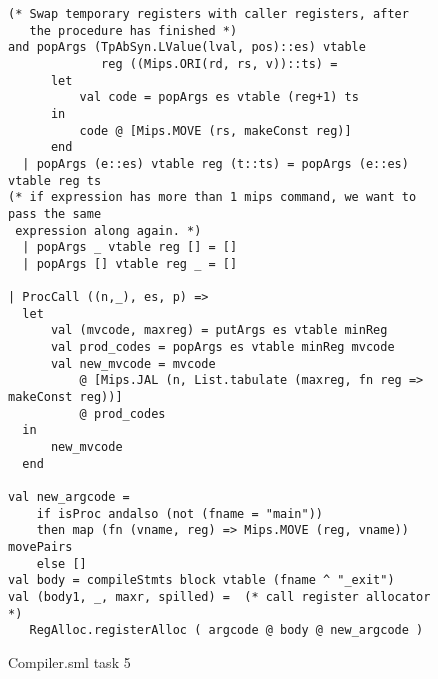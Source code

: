 \documentclass[12pt,a4paper,english]{article}
\begin{document}
\begin{figure}[h]
\begin{lstlisting}
(* Swap temporary registers with caller registers, after
   the procedure has finished *)
and popArgs (TpAbSyn.LValue(lval, pos)::es) vtable 
             reg ((Mips.ORI(rd, rs, v))::ts) =
      let 
          val code = popArgs es vtable (reg+1) ts
      in  
          code @ [Mips.MOVE (rs, makeConst reg)]
      end
  | popArgs (e::es) vtable reg (t::ts) = popArgs (e::es) vtable reg ts 
(* if expression has more than 1 mips command, we want to pass the same
 expression along again. *)
  | popArgs _ vtable reg [] = []
  | popArgs [] vtable reg _ = []

| ProcCall ((n,_), es, p) => 
  let
      val (mvcode, maxreg) = putArgs es vtable minReg
      val prod_codes = popArgs es vtable minReg mvcode
      val new_mvcode = mvcode
          @ [Mips.JAL (n, List.tabulate (maxreg, fn reg => makeConst reg))]
          @ prod_codes
  in
      new_mvcode
  end

val new_argcode = 
    if isProc andalso (not (fname = "main")) 
    then map (fn (vname, reg) => Mips.MOVE (reg, vname)) movePairs
    else []
val body = compileStmts block vtable (fname ^ "_exit")
val (body1, _, maxr, spilled) =  (* call register allocator *)
   RegAlloc.registerAlloc ( argcode @ body @ new_argcode )
\end{lstlisting}
\caption{Compiler.sml task 5}
\end{figure}
\end{document}
